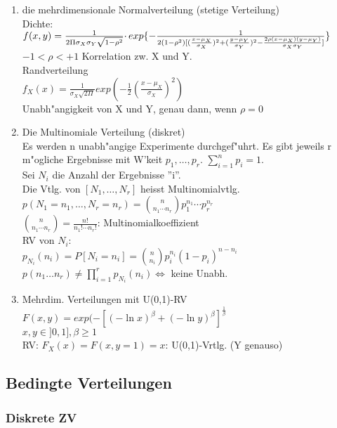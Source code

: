 \documentclass[10pt, a4paper, twocolumn]{scrartcl}
\begin{document}
\begin{enumerate}
 \item die mehrdimensionale Normalverteilung (stetige Verteilung)\\
  Dichte:\\
  $f(x,y)=\frac{1}{2\Pi\sigma_X\sigma_Y\sqrt{1-\rho^2}}\cdotp \\ exp\{-\frac{1}{2(1-\rho^2)[(\frac{x-\mu_X}{\sigma_X})^2+(\frac{y-\mu_Y}{\sigma_Y})^2-\frac{2\rho(x-\mu_X)(y-\mu_Y)}{\sigma_X\sigma_Y}]}\}$\\
  $-1<\rho<+1$ Korrelation zw. X und Y.\\
  Randverteilung\\
  $f_X(x)=\frac{1}{\sigma_X\sqrt{2\Pi}}exp(-\frac{1}{2}(\frac{x-\mu_X}{\sigma_X})^2)$\\
  Unabh"angigkeit von X und Y, genau dann, wenn $\rho=0$
 \item Die Multinomiale Verteilung (diskret)\\
  Es werden n unabh"angige Experimente durchgef"uhrt. Es gibt jeweils r m"ogliche Ergebnisse mit W'keit $p_1,\ldots,p_r$. $\sum^n_{i=1}p_i=1$.\\
  Sei $N_i$ die Anzahl der Ergebnisse ''i''.\\
  Die Vtlg. von $[N_1,\ldots,N_r]$ heisst Multinomialvtlg.\\
  $p(N_1=n_1,\ldots,N_r=n_r)=\binom{n}{n_1\cdots n_r}p_1^{n_1}\cdots p_r^{n_r}$\\
  $\binom{n}{n_1\cdots n_r}=\frac{n!}{n_1!\cdots n_r!}$: Multinomialkoeffizient\\
  RV von $N_i$:\\
  $p_{N_i}(n_i)=P[N_i=n_i]=\binom{n}{n_i}p_i^{n_i}(1-p_i)^{n-n_i}$\\
  $p(n_1\ldots n_r)\neq\prod\limits^r_{i=1}p_{N_i}(n_i)\Leftrightarrow$ keine Unabh.
 \item Mehrdim. Verteilungen mit U(0,1)-RV\\
  $F(x,y)=exp(-[(-\ln x)^\beta+(-\ln y)^\beta]^{\frac{1}{\beta}}$\\
  $x,y\in]0,1],\beta\geq 1$\\
  RV: $F_X(x)=F(x,y=1)=x$: U(0,1)-Vrtlg. (Y genauso)
\end{enumerate}

\subsection{Bedingte Verteilungen}

\subsubsection{Diskrete ZV}
\end{document}
